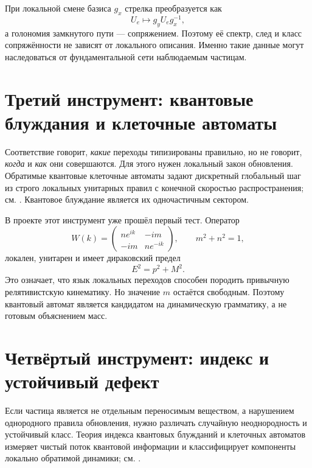 При локальной смене базиса $g_x$ стрелка преобразуется как
\begin{equation}
 U_e\longmapsto g_yU_eg_x^{-1},
\end{equation}
а голономия замкнутого пути --- сопряжением. Поэтому её спектр, след и
класс сопряжённости не зависят от локального описания. Именно такие данные
могут наследоваться от фундаментальной сети наблюдаемым частицам.

\section{Третий инструмент: квантовые блуждания и клеточные автоматы}

Соответствие говорит, \emph{какие} переходы типизированы правильно, но не
говорит, \emph{когда} и \emph{как} они совершаются. Для этого нужен
локальный закон обновления. Обратимые квантовые клеточные автоматы задают
дискретный глобальный шаг из строго локальных унитарных правил с конечной
скоростью распространения; см. . Квантовое
блуждание является их одночастичным сектором.

В проекте этот инструмент уже прошёл первый тест. Оператор
\begin{equation}
 W(k)=
 \begin{pmatrix}
 ne^{ik}&-im\\
 -im&ne^{-ik}
 \end{pmatrix},
 \qquad m^2+n^2=1,
 \label{eq:v5-transition-primitive-walk}
\end{equation}
локален, унитарен и имеет дираковский предел
\begin{equation}
 E^2=p^2+M^2.
\end{equation}
Это означает, что язык локальных переходов способен породить привычную
релятивистскую кинематику. Но значение $m$ остаётся свободным. Поэтому
квантовый автомат является кандидатом на динамическую грамматику, а не
готовым объяснением масс.

\section{Четвёртый инструмент: индекс и устойчивый дефект}

Если частица является не отдельным переносимым веществом, а нарушением
однородного правила обновления, нужно различать случайную неоднородность и
устойчивый класс. Теория индекса квантовых блужданий и клеточных автоматов
измеряет чистый поток квантовой информации и классифицирует компоненты
локально обратимой динамики; см. .

